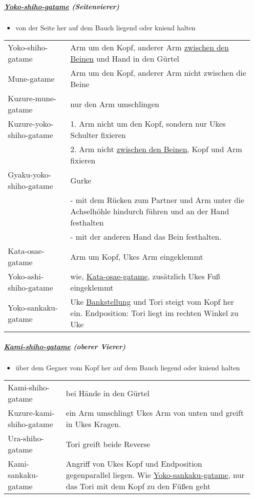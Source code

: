 \documentclass[justified, a4paper, notitlepage, captions=tableheading, nobib]{tufte-handout}
\begin{document}
\subparagraph{\hyperref[org6f6690b]{Yoko-shiho-gatame} (Seitenvierer)}
\label{sec:org87c5b3e}
\begin{itemize}
\item von der Seite her auf dem Bauch liegend oder kniend halten
\end{itemize}

\begin{center}
\begin{tabular}{ll}
\label{org6f6690b}Yoko-shiho-gatame & Arm um den Kopf, anderer Arm \hyperref[orge217f65]{zwischen den Beinen} und Hand in den Gürtel\\
\label{org53d9ef5}Mune-gatame & Arm um den Kopf, anderer Arm nicht zwischen die Beine\\
\label{org6388d73}Kuzure-mune-gatame & nur den Arm umschlingen\\
\label{org76b42a5}Kuzure-yoko-shiho-gatame & 1. Arm nicht um den Kopf, sondern nur Ukes Schulter fixieren\\
 & 2. Arm nicht \hyperref[orge217f65]{zwischen den Beinen}, Kopf und Arm fixieren\\
\label{org7c7cd3a}Gyaku-yoko-shiho-gatame & \label{orgf110735}Gurke\\
 & - mit dem Rücken zum Partner und Arm unter die Achselhöhle hindurch führen und an der Hand festhalten\\
 & - mit der anderen Hand das Bein festhalten.\\
\label{orgd6b44b1}Kata-osae-gatame & Arm um Kopf, Ukes Arm eingeklemmt\\
\label{org5cc0997}Yoko-ashi-shiho-gatame & wie, \hyperref[orgd6b44b1]{Kata-osae-gatame}, zusätzlich Ukes Fuß eingeklemmt\\
\label{org47b03da}Yoko-sankaku-gatame & Uke \hyperref[org9811981]{Bankstellung} und Tori steigt vom Kopf her ein. Endposition: Tori liegt im rechten Winkel zu Uke\\
\end{tabular}
\end{center}

\subparagraph{\hyperref[orgc73b9b4]{Kami-shiho-gatame} (oberer Vierer)}
\label{sec:org3cce063}

\begin{itemize}
\item über dem Gegner vom Kopf her auf dem Bauch liegend oder kniend halten
\end{itemize}

\begin{center}
\begin{tabular}{ll}
\label{orgc73b9b4}Kami-shiho-gatame & bei Hände in den Gürtel\\
\label{org12ec3ee}Kuzure-kami-shiho-gatame & ein Arm umschlingt Ukes Arm von unten und greift in Ukes Kragen.\\
\label{orga53abb8}Ura-shiho-gatame & Tori greift beide Reverse\\
\label{org59d7a06}Kami-sankaku-gatame & Angriff von Ukes Kopf und Endposition gegenparallel liegen. Wie \hyperref[org47b03da]{Yoko-sankaku-gatame}, nur das Tori mit dem Kopf zu den Füßen geht\\
\end{tabular}
\end{center}
\end{document}
